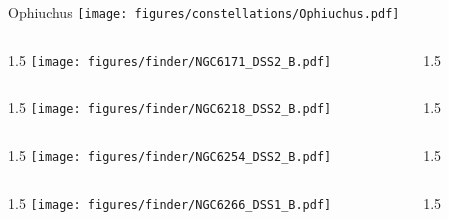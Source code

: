 \documentclass[final]{beamer}
\newlength{\colwidth}
\begin{document}

\begin{frame}[t]{\LARGE Ophiuchus}
  \centering
  \texttt{[image: figures/constellations/Ophiuchus.pdf]}
\end{frame}


\begin{frame}[t]{}
  \begin{columns}[T]
    \begin{column}{1.5\colwidth}
      \centering
      \texttt{[image: figures/finder/NGC6171\_DSS2\_B.pdf]}
    \end{column}
    \begin{column}{1.5\colwidth}
      \Large
      
    \end{column}
  \end{columns}
  \vspace{\fill}
  \begin{columns}[T]
    \begin{column}{1.5\colwidth}
      \centering
      \texttt{[image: figures/finder/NGC6218\_DSS2\_B.pdf]}
    \end{column}
    \begin{column}{1.5\colwidth}
      \Large
      
    \end{column}
  \end{columns}
\end{frame}


\begin{frame}[t]{}
  \begin{columns}[T]
    \begin{column}{1.5\colwidth}
      \centering
      \texttt{[image: figures/finder/NGC6254\_DSS2\_B.pdf]}
    \end{column}
    \begin{column}{1.5\colwidth}
      \Large
      
    \end{column}
  \end{columns}
  \vspace{\fill}
  \begin{columns}[T]
    \begin{column}{1.5\colwidth}
      \centering
      \texttt{[image: figures/finder/NGC6266\_DSS1\_B.pdf]}
    \end{column}
    \begin{column}{1.5\colwidth}
      \Large
      
    \end{column}
  \end{columns}
\end{frame}
\end{document}
